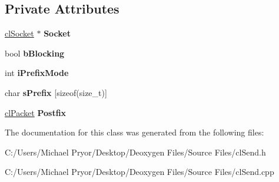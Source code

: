 \subsection*{Private Attributes}
\begin{DoxyCompactItemize}
\item 
\hypertarget{classcl_send_a1e2ba36f70b5e69beb7e22483fee0925}{
\hyperlink{classcl_socket}{clSocket} $\ast$ {\bfseries Socket}}
\label{classcl_send_a1e2ba36f70b5e69beb7e22483fee0925}

\item 
\hypertarget{classcl_send_a09b3672a85d18f163f80acc52d68c8f2}{
bool {\bfseries bBlocking}}
\label{classcl_send_a09b3672a85d18f163f80acc52d68c8f2}

\item 
\hypertarget{classcl_send_ae6c264d2d17f5ea9b121953928cafafa}{
int {\bfseries iPrefixMode}}
\label{classcl_send_ae6c264d2d17f5ea9b121953928cafafa}

\item 
\hypertarget{classcl_send_a39d150935482eb6f6b1d509d686d5a2d}{
char {\bfseries sPrefix} \mbox{[}sizeof(size\_\-t)\mbox{]}}
\label{classcl_send_a39d150935482eb6f6b1d509d686d5a2d}

\item 
\hypertarget{classcl_send_a917b39f9e28e1b5c14c5c092ba0491e2}{
\hyperlink{classcl_packet}{clPacket} {\bfseries Postfix}}
\label{classcl_send_a917b39f9e28e1b5c14c5c092ba0491e2}

\end{DoxyCompactItemize}


The documentation for this class was generated from the following files:\begin{DoxyCompactItemize}
\item 
C:/Users/Michael Pryor/Desktop/Deoxygen Files/Source Files/clSend.h\item 
C:/Users/Michael Pryor/Desktop/Deoxygen Files/Source Files/clSend.cpp\end{DoxyCompactItemize}
